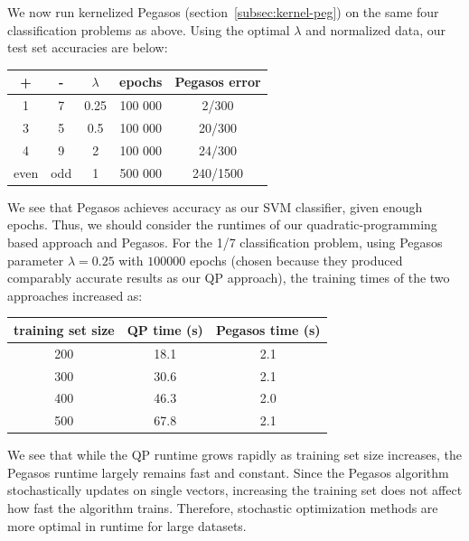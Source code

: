 \documentclass{article}
\begin{document}
\begin{multicols}{2}
We now run kernelized Pegasos (section~\ref{subsec:kernel-peg})
on the same four classification problems as above.
Using the optimal $\lambda$ and normalized data, our test set accuracies
are below: 
\begin{center} 
\begin{tabular}{|c|c|c|c|c|}
\hline
+ & - & $\lambda$ & epochs & Pegasos error \\\hline
1 & 7 & 0.25 & 100 000 & 2/300 \\
3 & 5 & 0.5 & 100 000 & 20/300\\
4 & 9 & 2 & 100 000 & 24/300\\
even & odd & 1 & 500 000 & 240/1500 \\\hline
\end{tabular}
\end{center}

We see that Pegasos achieves accuracy as our SVM classifier, given enough epochs.
Thus, we should consider the runtimes of
our quadratic-programming based approach and Pegasos.
For the 1/7 classification problem,
using Pegasos parameter $\lambda = 0.25$ with $100 000$ epochs
(chosen because they produced comparably accurate results as our QP approach),
the training times of the two approaches increased as:
\begin{center}
    \begin{tabular}{|c|c|c|}\hline
        training set size & QP time (s) & Pegasos time (s) \\\hline
        200 & 18.1 & 2.1\\
        300 & 30.6 & 2.1\\
        400 & 46.3 & 2.0\\
        500 & 67.8 & 2.1\\\hline
    \end{tabular}
\end{center}

We see that while the QP runtime grows rapidly as training set size increases, the 
Pegasos runtime largely remains fast and constant. Since the Pegasos algorithm stochastically 
updates on single vectors, increasing the training set does not affect how fast the algorithm 
trains. Therefore, stochastic optimization methods are more optimal in runtime for
large datasets.

\end{multicols}
\end{document}

